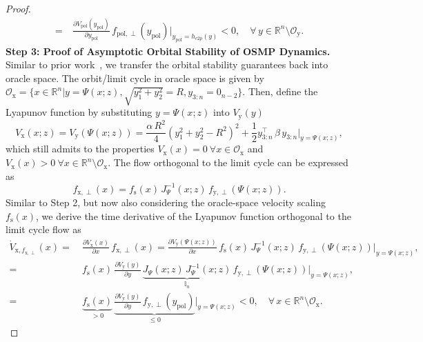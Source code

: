 \begin{proof}
\begin{equation}
\begin{split}
        =& \: \frac{\partial V_\mathrm{pol}(y_\mathrm{pol})}{\partial y_\mathrm{pol}} \, f_{\mathrm{pol},\perp}(y_\mathrm{pol}) \Bigg |_{y_\mathrm{pol} = h_{c2p}(y)} < 0, \quad \forall \, y \in \mathbb{R}^n \setminus \mathcal{O}_\mathrm{y}.
    \end{split}
    \end{equation}
    \textbf{Step 3: Proof of Asymptotic Orbital Stability of \gls{OSMP} Dynamics.}
    Similar to prior work~\citep{rana2020euclideanizing, urain2020imitationflow, zhi2024teaching}, we transfer the orbital stability guarantees back into oracle space.
    The orbit/limit cycle in oracle space is given by
    $\mathcal{O}_\mathrm{x} = \{ x \in \mathbb{R}^n | y=\Psi(x;z), \sqrt{y_1^2 + y_2^2} = R, y_{3:n} = 0_{n-2} \}$.
    Then, define the Lyapunov function by substituting $y = \Psi(x;z)$ into $V_\mathrm{y}(y)$
    \begin{equation}
         V_\mathrm{x}(x;z) = V_\mathrm{y}(\Psi(x;z)) = \frac{\alpha \, R^2}{4} \left ( y_1^2+y_2^2 - R^2 \right )^2 + \frac{1}{2} y_{3:n}^\top \, \beta \, y_{3:n} \Bigg |_{y=\Psi(x;z)},
    \end{equation}
    which still admits to the properties $V_\mathrm{x}(x) = 0 \: \forall x \in \mathcal{O}_\mathrm{x}$ and $V_\mathrm{x}(x) > 0 \: \forall x \in \mathbb{R}^n \setminus \mathcal{O}_\mathrm{x}$.
    The flow orthogonal to the limit cycle can be expressed as 
    \begin{equation}
        f_{\mathrm{x},\perp}(x) = f_\mathrm{s}(x) \, J_\Psi^{-1}(x;z) \, f_{\mathrm{y},\perp}(\Psi(x;z)).
    \end{equation}
    Similar to Step 2, but now also considering the oracle-space velocity scaling $f_\mathrm{s}(x)$, we derive the time derivative of the Lyapunov function orthogonal to the limit cycle flow as
    \begin{equation}
    \begin{split}
        \dot{V}_{\mathrm{x},f_{\mathrm{x},\perp}}(x) =& \: \frac{\partial V_\mathrm{x}(x)}{\partial x} \, f_{\mathrm{x},\perp}(x) = \frac{\partial V_\mathrm{y}(\Psi(x;z))}{\partial x} \, f_\mathrm{s}(x) \, J_\Psi^{-1}(x;z) \, f_{\mathrm{y},\perp}(\Psi(x;z)) \Bigg |_{y = \Psi(x;z)},\\
        =& \: f_\mathrm{s}(x) \, \frac{\partial V_\mathrm{y}(y)}{\partial y} \, \underbrace{J_\Psi(x;z) \, J_\Psi^{-1}(x;z)}_{\mathbb{I}_n} \, f_{\mathrm{y},\perp}(\Psi(x;z)) \Bigg |_{y = \Psi(x;z)},\\
        =& \: \underbrace{f_\mathrm{s}(x)}_{>0} \, \underbrace{\frac{\partial V_\mathrm{y}(y)}{\partial y} \, f_{\mathrm{y},\perp}(y_\mathrm{pol})}_{\leq 0} \bigg |_{y = \Psi(x;z)} < 0, \quad \forall \, x \in \mathbb{R}^n \setminus \mathcal{O}_\mathrm{x}.
    \end{split}
    \end{equation}
\end{proof}

